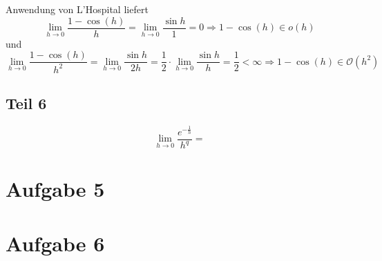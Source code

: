 \documentclass[10pt,a4paper]{article}
\begin{document}
Anwendung von L'Hospital liefert
\begin{equation}
  \lim_{h \rightarrow 0} \frac{1 - \cos(h)}{h} = \lim_{h \rightarrow 0} \frac{\sin h}{1} = 0 \Rightarrow 1 - \cos(h) \in o(h)
\end{equation}
und
\begin{equation}
  \lim_{h \rightarrow 0} \frac{1 - \cos(h)}{h^{2}} = \lim_{h \rightarrow 0} \frac{\sin h}{2h} = \frac{1}{2} \cdot \lim_{h \rightarrow 0} \frac{\sin h}{h} = \frac{1}{2} < \infty \Rightarrow 1 - \cos(h) \in \mathcal{O}(h^{2})
\end{equation}

\subsection{Teil 6}

\begin{equation}
  \lim_{h \rightarrow 0} \frac{e^{-\frac{1}{h}}}{h^{q}} =
\end{equation}

\section{Aufgabe 5}



\section{Aufgabe 6}
\end{document}
